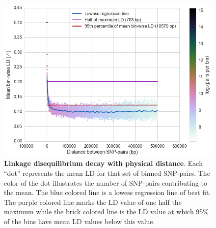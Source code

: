 \documentclass[letterpaper]{scrartcl}
\begin{document}
\begin{figure}[htbp]
\centering
\includegraphics{../figures/ld_decay_by_physical_distance.png}
\caption{\textbf{Linkage disequilibrium decay with physical distance}.
Each ``dot'' represents the mean LD for that set of binned SNP-pairs.
The color of the dot illustrates the number of SNP-pairs contributing to
the mean. The blue colored line is a lowess regression line of best fit.
The purple colored line marks the LD value of one half the maximum while
the brick colored line is the LD value at which 95\% of the bins have
mean LD values below this value.}
\end{figure}
\end{document}
